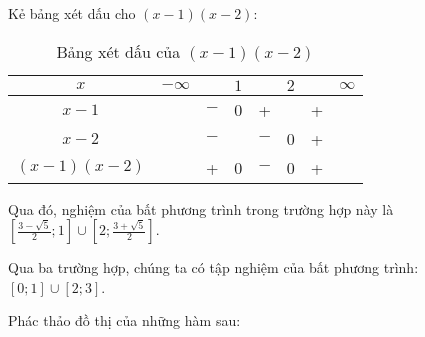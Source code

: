 Kẻ bảng xét dấu cho $(x - 1)(x - 2)$:
\begin{table}[H]
   \centering
   \begin{tabular}{|c|ccccccc|}
      \hline
      $x$          & $-\infty$ &     & $1$ &     & $2$ &   & $\infty$ \\
      \hline
      $x-1$        &           & $-$ &  0  &  +  &     & + &           \\
      \hline
      $x-2$        &           & $-$ &     & $-$ &  0  & + &           \\
      \hline
      $(x-1)(x-2)$ &           &  +  &  0  & $-$ &  0  & + &           \\
      \hline
   \end{tabular}
   \caption{Bảng xét dấu của $(x-1)(x-2)$}
\end{table}

Qua đó, nghiệm của bất phương trình trong trường hợp này là $\left[\frac{3 - \sqrt{5}}{2}; 1\right] \cup \left[2; \frac{3 + \sqrt{5}}{2}\right]$.

Qua ba trường hợp, chúng ta có tập nghiệm của bất phương trình: $\left[0; 1\right] \cup \left[2; 3\right]$.

\exercise Phác thảo đồ thị của những hàm sau:

